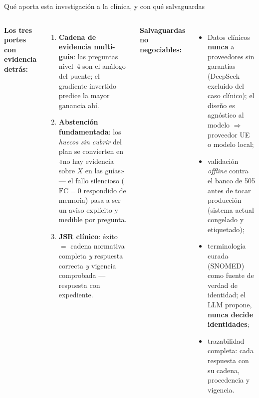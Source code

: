 \documentclass[aspectratio=169,10pt]{beamer}
\begin{document}
\begin{frame}{Qué aporta esta investigación a la clínica, y con qué salvaguardas}
\begin{columns}[T]
\textbf{Los tres portes con evidencia detrás:}
\begin{enumerate}\small
\item \textbf{Cadena de evidencia multi-guía}: las preguntas nivel~4 son el
  análogo del puente; el gradiente invertido predice la mayor ganancia ahí.
\item \textbf{Abstención fundamentada}: los \emph{huecos sin cubrir} del plan
  se convierten en «no hay evidencia sobre $X$ en las guías» --- el fallo
  silencioso ($\mathrm{FC}=0$ respondido de memoria) pasa a ser un aviso
  explícito y medible por pregunta.
\item \textbf{JSR clínico}: éxito $=$ cadena normativa completa \emph{y}
  respuesta correcta \emph{y} vigencia comprobada --- respuesta con expediente.
\end{enumerate}
\textbf{Salvaguardas no negociables:}
\begin{itemize}\small
\item Datos clínicos \textbf{nunca} a proveedores sin garantías (DeepSeek
  excluido del caso clínico); el diseño es agnóstico al modelo $\Rightarrow$
  proveedor UE o modelo local;
\item validación \emph{offline} contra el banco de 505 antes de tocar
  producción (sistema actual congelado y etiquetado);
\item terminología curada (SNOMED) como fuente de verdad de identidad;
  el LLM propone, \textbf{nunca decide identidades};
\item trazabilidad completa: cada respuesta con su cadena, procedencia
  y vigencia.
\end{itemize}
\end{columns}
\end{frame}
\end{document}
